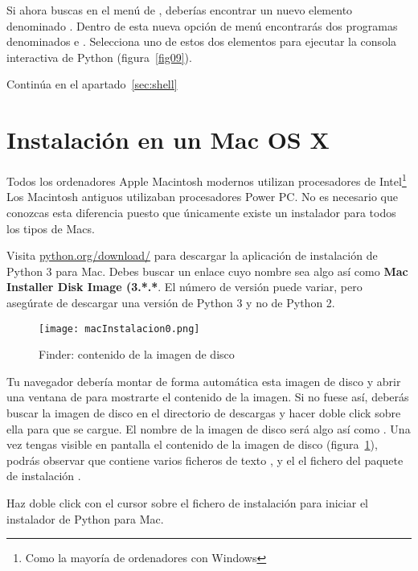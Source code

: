 Si ahora buscas en el menú de , deberías encontrar un nuevo elemento denominado . Dentro de esta nueva opción de menú encontrarás dos programas denominados  e . Selecciona uno de estos dos elementos para ejecutar la consola interactiva de Python (figura~\ref{fig09}).

Continúa en el apartado~\ref{sec:shell}

\section{Instalación en un Mac OS X}

Todos los ordenadores Apple Macintosh modernos utilizan procesadores de Intel\footnote{Como la mayoría de ordenadores con Windows} Los Macintosh antiguos utilizaban procesadores Power PC. No es necesario que conozcas esta diferencia puesto que únicamente existe un instalador para todos los tipos de Macs.

Visita \href{http://python.org/download/}{python.org/download/} para descargar la aplicación de instalación de Python 3 para Mac. Debes buscar un enlace cuyo nombre sea algo así como \textbf{Mac Installer Disk Image (3.*.*}. El número de versión puede variar, pero asegúrate de descargar una versión de Python 3 y no de Python 2.


\begin{figure}[!h]
  \begin{center}
\texttt{[image: macInstalacion0.png]}
\caption{Finder: contenido de la imagen de disco}\label{figm00}
  \end{center}
\end{figure}

Tu navegador debería montar de forma automática esta imagen de disco y abrir una ventana de  para mostrarte el contenido de la imagen. Si no fuese así, deberás buscar la imagen de disco en el directorio de descargas y hacer doble click sobre ella para que se cargue. El nombre de la imagen de disco será algo así como . Una vez tengas visible en pantalla el contenido de la imagen de disco (figura~\ref{figm00}), podrás observar que contiene varios ficheros de texto , y el el fichero del paquete de instalación .

Haz doble click con el cursor sobre el fichero de instalación  para iniciar el instalador de Python para Mac.


